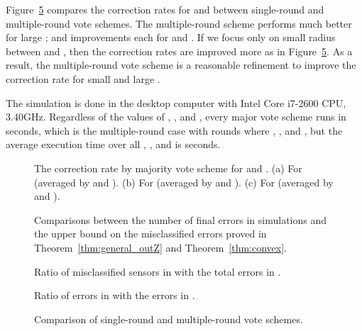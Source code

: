 \documentclass{article}
\begin{document}
\par
Figure~\ref{fig:sim-s-m} compares the correction rates for  and  between single-round and multiple-round vote schemes. The multiple-round scheme performs much better for large ;  and  improvements each for  and . If we focus only on small radius  between  and , then the correction rates are improved more as in Figure~\ref{fig:sim-s-m}. As a result, the multiple-round vote scheme is a reasonable refinement to improve the correction rate for small  and large .

The simulation is done in the desktop computer with Intel Core i7-2600 CPU, 3.40GHz. Regardless of the values of , , and , every major vote scheme runs in  seconds, which is the multiple-round case with  rounds where , , and , but the average execution time over all , , and  is  seconds.

\begin{figure}
\centering
\mbox{}
\mbox{}
\mbox{}
\caption{The correction rate by majority vote scheme for  and . (a) For  (averaged by  and ). (b) For  (averaged by  and ). (c) For  (averaged by  and ).}
\label{fig:sim-ratio}
\end{figure}

\begin{figure}
\centering
\mbox{}
\mbox{}
\mbox{}
\caption{Comparisons between the number of final errors in simulations and the upper bound on the misclassified errors proved in Theorem~\ref{thm:general_outZ} and Theorem~\ref{thm:convex}.}
\label{fig:sim-ub-final}
\end{figure}

\begin{figure}
\centering
\mbox{}
\mbox{}
\mbox{}
\caption{Ratio of misclassified sensors in  with the total errors in .}
\label{fig:sim-beta}
\end{figure}

\begin{figure}
\centering
\mbox{}
\mbox{}
\mbox{}
\caption{Ratio of errors in  with the errors in .}
\label{fig:sim-gamma}
\end{figure}

\begin{figure}
\centering
\mbox{}
\mbox{}
\mbox{}
\caption{Comparison of single-round and multiple-round vote schemes.}
\label{fig:sim-s-m}
\end{figure}
\end{document}
